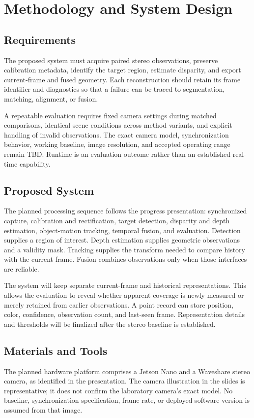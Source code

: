 \chapter{Methodology and System Design}
\section{Requirements}
The proposed system must acquire paired stereo observations, preserve calibration metadata, identify the target region, estimate disparity, and export current-frame and fused geometry. Each reconstruction should retain its frame identifier and diagnostics so that a failure can be traced to segmentation, matching, alignment, or fusion.

A repeatable evaluation requires fixed camera settings during matched comparisons, identical scene conditions across method variants, and explicit handling of invalid observations. The exact camera model, synchronization behavior, working baseline, image resolution, and accepted operating range remain TBD. Runtime is an evaluation outcome rather than an established real-time capability.

\section{Proposed System}
The planned processing sequence follows the progress presentation: synchronized capture, calibration and rectification, target detection, disparity and depth estimation, object-motion tracking, temporal fusion, and evaluation. Detection supplies a region of interest. Depth estimation supplies geometric observations and a validity mask. Tracking supplies the transform needed to compare history with the current frame. Fusion combines observations only when those interfaces are reliable.

The system will keep separate current-frame and historical representations. This allows the evaluation to reveal whether apparent coverage is newly measured or merely retained from earlier observations. A point record can store position, color, confidence, observation count, and last-seen frame. Representation details and thresholds will be finalized after the stereo baseline is established.

\section{Materials and Tools}
The planned hardware platform comprises a Jetson Nano and a Waveshare stereo camera, as identified in the presentation. The camera illustration in the slides is representative; it does not confirm the laboratory camera's exact model. No baseline, synchronization specification, frame rate, or deployed software version is assumed from that image.

